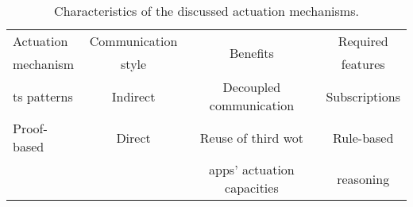 
\begin{table}[htbp]
  \caption{Characteristics of the discussed actuation mechanisms.}
  \begin{center}
    \footnotesize
    \begin{tabular}{lccc}
      \hline
      Actuation &
      Communication & %
      \multirow{2}{*}{Benefits} &
      Required \\
      mechanism &
      style &
      ~ &
      features \\
      \hline
      \ac{ts} patterns & Indirect & Decoupled communication & Subscriptions \\
      Proof-based & Direct & Reuse of third \ac{wot} & Rule-based \\ %
      & & apps' actuation capacities & reasoning \\
      \hline
    \end{tabular}
  \end{center}
  \label{tab:network_properties}
\end{table}